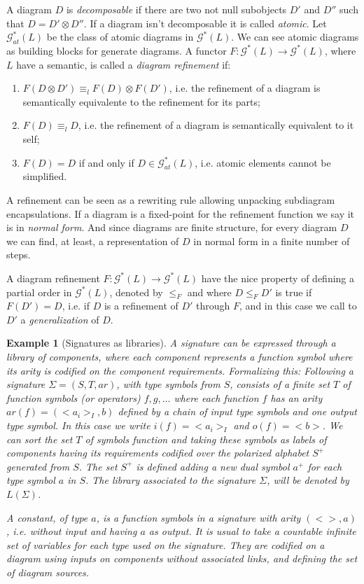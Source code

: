 \documentclass[oribibl]{llncs}
\newtheorem{exam}{Example}
\newcommand{\G}{\mathcal{G}}
\begin{document}
A diagram $D$ is \emph{decomposable} if there are two not null subobjects $D'$ and $D''$ such that $D=D'\otimes D''$. If a diagram isn't decomposable it is called \emph{atomic}. Let $\G_{at}^\ast(L)$ be the class of atomic diagrams in $\G^\ast(L)$. We can see atomic diagrams as building blocks for generate diagrams. A functor $F:\G^\ast(L)\rightarrow \G^\ast(L)$, where $L$ have a semantic, is called a \emph{diagram refinement} if:
\begin{enumerate}
  \item $F(D\otimes D')\equiv_l F(D)\otimes F(D')$, i.e. the refinement of a diagram is semantically equivalente to the refinement for its parts;
  \item $F(D)\equiv_l D$, i.e. the refinement of a diagram is semantically equivalent to it self;
  \item $F(D)=D$ if and only if $D\in \G_{at}^\ast(L)$, i.e. atomic elements cannot be simplified.
\end{enumerate}
A refinement can be seen as a rewriting rule allowing unpacking subdiagram encapsulations. If a diagram is a fixed-point for the refinement function we say it is in \emph{normal form}. And since diagrams are finite structure, for every diagram $D$ we can find, at least, a representation of $D$ in normal form in a finite number of steps.

A diagram refinement $F:\G^\ast(L)\rightarrow \G^\ast(L)$ have the nice property of defining a partial order in $\G^\ast(L)$, denoted by $\leq_F$ and where $D \leq_F D'$ is true if $F(D')=D$, i.e. if $D$ is a refinement of $D'$ through $F$, and in this case we call to $D'$ a \emph{generalization} of $D$.

\begin{exam}[Signatures as libraries]\label{ex:signature}
A signature can be expressed through a library of components, where each component represents a function symbol where its arity is codified on the component requirements. Formalizing this: Following \cite{Makki89} a signature
$\Sigma=(S,T,ar)$,  with type symbols from $S$, consists of a finite
set $T$ of function symbols (or operators) $f,g,\ldots$ where each
function $f$ has an arity ${ar(f)=(<a_i>_I,b)}$ defined by a chain of
input type symbols and one output type symbol. In this case we write
$i(f)=<a_i>_I$ and $o(f)=<b>$. We can sort the set $T$ of symbols
function and taking these symbols as labels of components having its
requirements codified over the polarized alphabet $S^+$ generated from
$S$. The set $S^+$ is defined adding a new dual symbol $a^+$ for
each type symbol $a$ in $S$. The library associated to the signature
$\Sigma$, will be denoted by $L(\Sigma )$.

A constant, of type $a$, is a function symbols in a signature with
arity $(<>,a)$, i.e. without input and having $a$ as output. It
is usual to take a countable infinite set of variables for each type
used on the signature. They are codified on a diagram using
inputs on components without associated links, and defining the
set of diagram sources.
\end{exam}
\end{document}
